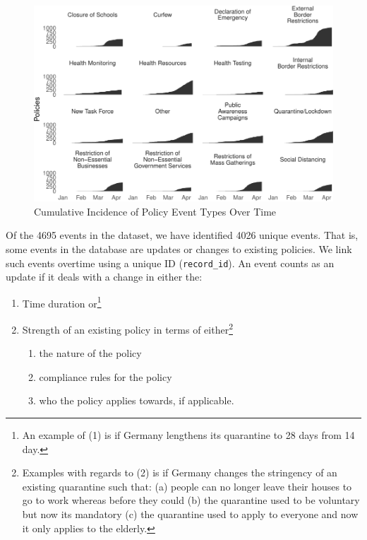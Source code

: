 \documentclass[]{article}
\providecommand{\tightlist}{%
  \setlength{\itemsep}{0pt}\setlength{\parskip}{0pt}}
\let\rmarkdownfootnote\footnote%
\def\footnote{\protect\rmarkdownfootnote}
\begin{document}
\begin{figure}
\centering
\includegraphics{corona_wp_files/figure-latex/overtime-1.pdf}
\caption{\label{fig:overtime}Cumulative Incidence of Policy Event Types Over Time}
\end{figure}

Of the 4695 events in the dataset, we have identified 4026 unique events. That is, some events in the database are updates or changes to existing policies. We link such events overtime using a unique ID (\texttt{record\_id}). An event counts as an update if it deals with a change in either the:

\begin{enumerate}
\def\labelenumi{\arabic{enumi}.}
\tightlist
\item
  Time duration or\footnote{An example of (1) is if Germany lengthens its quarantine to 28 days from 14 day.}
\item
  Strength of an existing policy in terms of either\footnote{Examples with regards to (2) is if Germany changes the stringency of an existing quarantine such that: (a) people can no longer leave their houses to go to work whereas before they could (b) the quarantine used to be voluntary but now its mandatory (c) the quarantine used to apply to everyone and now it only applies to the elderly.}

  \begin{enumerate}
  \def\labelenumii{\alph{enumii}.}
  \tightlist
  \item
    the nature of the policy
  \item
    compliance rules for the policy
  \item
    who the policy applies towards, if applicable.
  \end{enumerate}
\end{enumerate}
\end{document}
